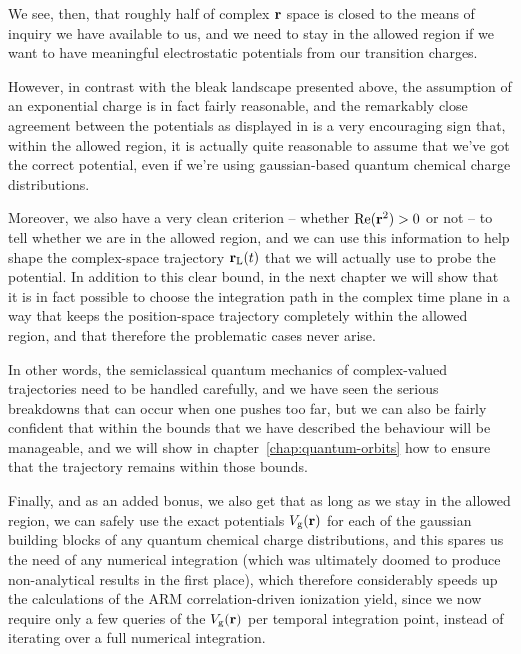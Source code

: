 We see, then, that roughly half of complex $\vb{r}$ space is closed to the means of inquiry we have available to us, and we need to stay in the allowed region if we want to have meaningful electrostatic potentials from our transition charges.

However, in contrast with the bleak landscape presented above, the assumption of an exponential charge is in fact fairly reasonable, and the remarkably close agreement between the potentials as displayed in  is a very encouraging sign that, within the allowed region, it is actually quite reasonable to assume that we've got the correct potential, even if we're using gaussian-based quantum chemical charge distributions.

Moreover, we also have a very clean criterion -- whether $\Re(\vb{r}^2)>0$ or not -- to tell whether we are in the allowed region, and we can use this information to help shape the complex-space trajectory $\vb{r}_\mathrm{L}(t)$ that we will actually use to probe the potential. In addition to this clear bound, in the next chapter we will show that it is in fact possible to choose the integration path in the complex time plane in a way that keeps the position-space trajectory completely within the allowed region, and that therefore the problematic cases never arise. 

In other words, the semiclassical quantum mechanics of complex-valued trajectories need to be handled carefully, and we have seen the serious breakdowns that can occur when one pushes too far, but we can also be fairly confident that within the bounds that we have described the behaviour will be manageable, and we will show in chapter~\ref{chap:quantum-orbits} how to ensure that the trajectory remains within those bounds.


Finally, and as an added bonus, we also get that as long as we stay in the allowed region, we can safely use the exact potentials $V_\mathrm{g}(\vb{r})$ for each of the gaussian building blocks of any quantum chemical charge distributions, and this spares us the need of any numerical integration (which was ultimately doomed to produce non-analytical results in the first place), which therefore considerably speeds up the calculations of the ARM correlation-driven ionization yield, since we now require only a few queries of the $V_\mathrm{g}(\vb{r})$ per temporal integration point, instead of iterating over a full numerical integration.


































   